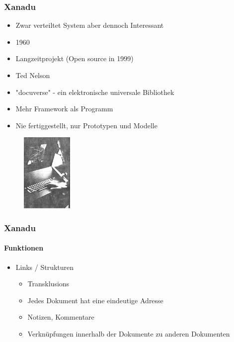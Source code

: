 \begin{frame}
\frametitle{Xanadu}
\begin{itemize}
	\item Zwar verteiltet System aber dennoch Interessant
	\item 1960
	\item Langzeitprojekt (Open source in 1999)
	\item Ted Nelson
	\item "docuverse" - ein elektronische universale Bibliothek
	\item Mehr Framework als Programm
	\item Nie fertiggestellt, nur Prototypen und Modelle
\end{itemize}

\begin{figure}[htbp]
	\centering
	\includegraphics[width=0.22\textwidth]{images/xanadu}
\end{figure}

\end{frame}

\begin{frame}
\frametitle{Xanadu}
\framesubtitle{Funktionen}
\begin{itemize}
	\item Links / Strukturen
	\begin{itemize}
		\item Transklusions
		\item Jedes Dokument hat eine eindeutige Adresse
		\item Notizen, Kommentare
		\item Verknüpfungen innerhalb der Dokumente zu anderen Dokumenten
	\end{itemize}
\end{itemize}
\end{frame}
